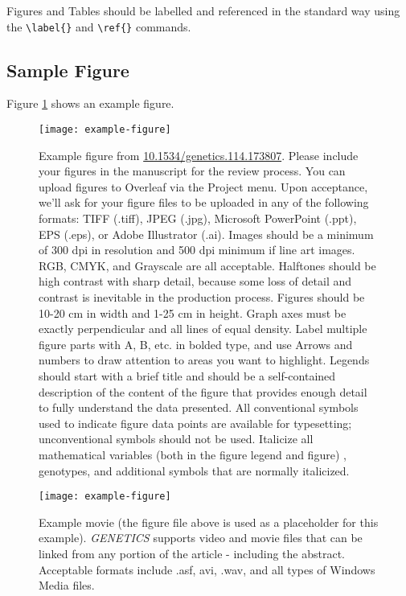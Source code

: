 \documentclass[9pt,twocolumn,twoside]{gsajnl}
\begin{document}
Figures and Tables should be labelled and referenced in the standard way using the \verb|\label{}| and \verb|\ref{}| commands.

\subsection*{Sample Figure}

Figure \ref{fig:spectrum} shows an example figure.

\begin{figure}[htbp]
\centering
\texttt{[image: example-figure]}
\caption{Example figure from \url{10.1534/genetics.114.173807}. Please include your figures in the manuscript for the review process. You can upload figures to Overleaf via the Project menu. Upon acceptance, we'll ask for your figure files to be uploaded in any of the following formats: TIFF (.tiff), JPEG (.jpg), Microsoft PowerPoint (.ppt), EPS (.eps), or Adobe Illustrator (.ai).  Images should be a minimum of 300 dpi in resolution and 500 dpi minimum if line art images.  RGB, CMYK, and Grayscale are all acceptable. Halftones should be high contrast with sharp detail, because some loss of detail and contrast is inevitable in the production process. Figures should be 10-20 cm in width and 1-25 cm in height. Graph axes must be exactly perpendicular and all lines of equal density.
Label multiple figure parts with A, B, etc. in bolded type, and use Arrows and numbers to draw attention to areas you want to highlight. Legends should start with a brief title and should be a self-contained description of the content of the figure that provides enough detail to fully understand the data presented. All conventional symbols used to indicate figure data points are available for typesetting; unconventional symbols should not be used. Italicize all mathematical variables (both in the figure legend and figure) , genotypes, and additional symbols that are normally italicized.  
}%
\label{fig:spectrum}
\end{figure}


\begin{figure}[htbp]
\centering
\texttt{[image: example-figure]}
\caption{Example movie (the figure file above is used as a placeholder for this example). \textit{GENETICS} supports video and movie files that can be linked from any portion of the article - including the abstract. Acceptable formats include .asf, avi, .wav, and all types of Windows Media files.   
}%
\label{video:spectrum}
\end{figure}
\end{document}
